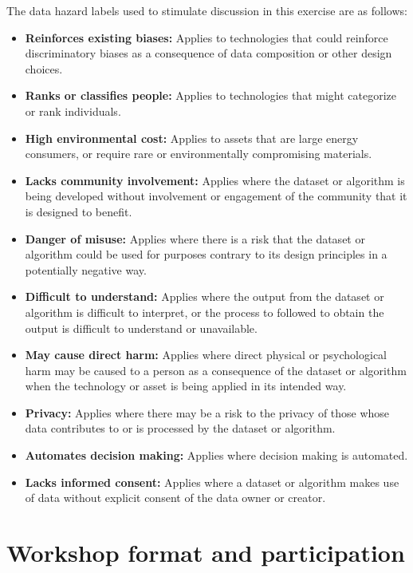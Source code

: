 \documentclass{article}
\begin{document}
The data hazard labels used to stimulate discussion in this exercise
are as follows:

\begin{itemize}
\item \textbf{Reinforces existing biases:} Applies to technologies
  that could reinforce discriminatory biases as a consequence of data
  composition or other design choices. 
\item \textbf{Ranks or classifies people:} Applies to technologies
  that might categorize or rank individuals.
\item \textbf{High environmental cost:} Applies to assets that are
  large energy consumers, or require rare or environmentally
  compromising materials.
\item \textbf{Lacks community involvement:} Applies where the dataset
  or algorithm is being developed without involvement or engagement of
  the community that it is designed to benefit.
\item \textbf{Danger of misuse:} Applies where there is a risk that the dataset or
  algorithm could be used for purposes contrary to its
  design principles in a potentially negative way. 
\item \textbf{Difficult to understand:} Applies where the output from
  the dataset or algorithm is difficult to interpret, or the process
  to followed to obtain the output is difficult to understand or unavailable.
\item \textbf{May cause direct harm:} Applies where direct physical or
  psychological harm may be caused to a person as a consequence of the
  dataset or algorithm when the technology or asset is being applied
  in its intended way.
\item \textbf{Privacy:} Applies where there may be a risk to the
  privacy of those whose data contributes to or is processed by the
  dataset or algorithm. 
\item \textbf{Automates decision making:} Applies where decision
  making is automated.
\item \textbf{Lacks informed consent:} Applies where a dataset or
  algorithm makes use of data without explicit consent of the data
  owner or creator.
\end{itemize}

\section{Workshop format and participation}
\end{document}
